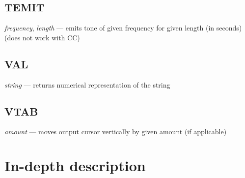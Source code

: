 \subsection{TEMIT} \emph{frequency}, \emph{length} --- emits tone of given frequency for given length (in seconds) (does not work with CC)
\subsection{VAL} \emph{string} --- returns numerical representation of the string
\subsection{VTAB} \emph{amount} --- moves output cursor vertically by given amount (if applicable)

\section{In-depth description}